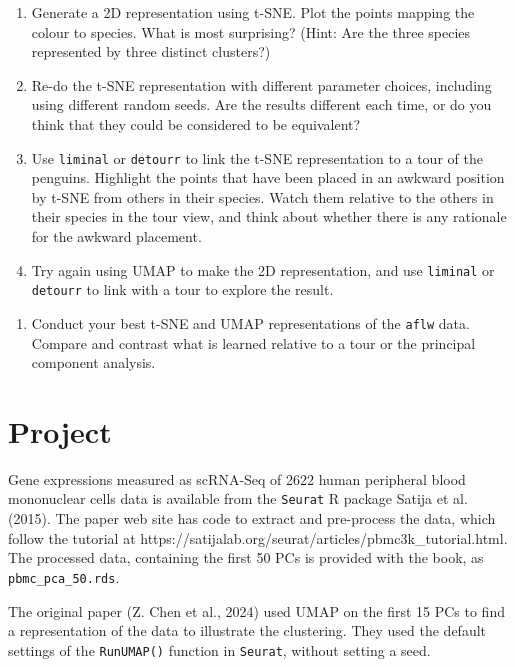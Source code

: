 \documentclass[
  letterpaper,
]{krantz}
\providecommand{\tightlist}{%
  \setlength{\itemsep}{0pt}\setlength{\parskip}{0pt}}\usepackage{longtable,booktabs,array}
\begin{document}
\begin{enumerate}
\def\labelenumi{\alph{enumi}.}
\tightlist
\item
  Generate a 2D representation using t-SNE. Plot the points mapping the
  colour to species. What is most surprising? (Hint: Are the three
  species represented by three distinct clusters?)
\item
  Re-do the t-SNE representation with different parameter choices,
  including using different random seeds. Are the results different each
  time, or do you think that they could be considered to be equivalent?
\item
  Use \texttt{liminal} or \texttt{detourr} to link the t-SNE
  representation to a tour of the penguins. Highlight the points that
  have been placed in an awkward position by t-SNE from others in their
  species. Watch them relative to the others in their species in the
  tour view, and think about whether there is any rationale for the
  awkward placement.
\item
  Try again using UMAP to make the 2D representation, and use
  \texttt{liminal} or \texttt{detourr} to link with a tour to explore
  the result.
\end{enumerate}

\begin{enumerate}
\def\labelenumi{\arabic{enumi}.}
\setcounter{enumi}{1}
\tightlist
\item
  Conduct your best t-SNE and UMAP representations of the \texttt{aflw}
  data. Compare and contrast what is learned relative to a tour or the
  principal component analysis.
\end{enumerate}

\section*{Project}\label{project-1}


Gene expressions measured as scRNA-Seq of 2622 human peripheral blood
mononuclear cells data is available from the \texttt{Seurat} R package
Satija et al. (2015). The paper web site has code to extract and
pre-process the data, which follow the tutorial at
https://satijalab.org/seurat/articles/pbmc3k\_tutorial.html. The
processed data, containing the first 50 PCs is provided with the book,
as \texttt{pbmc\_pca\_50.rds}.

The original paper (Z. Chen et al., 2024) used UMAP on the first 15 PCs
to find a representation of the data to illustrate the clustering. They
used the default settings of the \texttt{RunUMAP()} function in
\texttt{Seurat}, without setting a seed.
\end{document}

